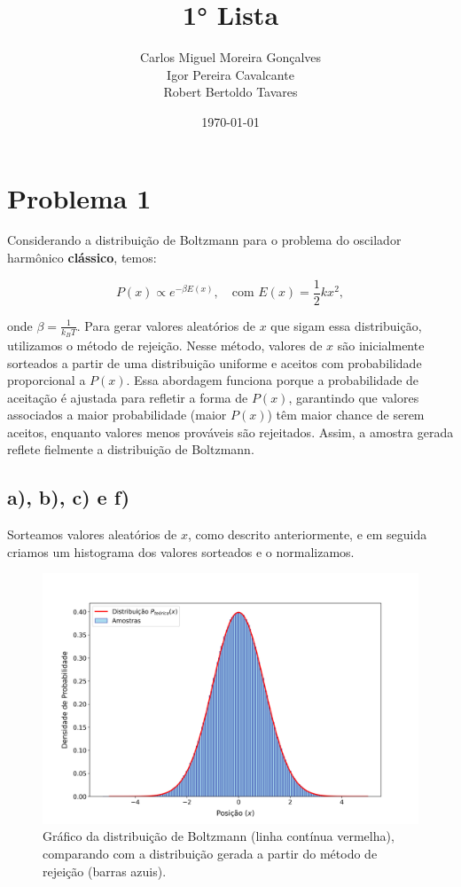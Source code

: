\documentclass[a4paper, 12pt]{article}
\title{\textbf{1° Lista}}
\author{
    Carlos Miguel Moreira Gonçalves \\
    Igor Pereira Cavalcante \\
    Robert Bertoldo Tavares \\
}
\date{\today}
\begin{document}
\maketitle
\thispagestyle{fancy}

\section*{Problema 1}
Considerando a distribuição de Boltzmann para o problema do oscilador harmônico \textbf{clássico}, temos:

\begin{equation}
P(x) \propto e^{-\beta E(x)}, \quad \text{com } E(x) = \frac{1}{2} k x^2,
\end{equation}

onde \(\beta = \frac{1}{k_B T}\). Para gerar valores aleatórios de \(x\) que sigam essa distribuição, utilizamos o método de rejeição. Nesse método, valores de \(x\) são inicialmente sorteados a partir de uma distribuição uniforme e aceitos com probabilidade proporcional a \(P(x)\). Essa abordagem funciona porque a probabilidade de aceitação é ajustada para refletir a forma de \(P(x)\), garantindo que valores associados a maior probabilidade (maior \(P(x)\)) têm maior chance de serem aceitos, enquanto valores menos prováveis são rejeitados. Assim, a amostra gerada reflete fielmente a distribuição de Boltzmann.

\subsection*{a), b), c) e f)}

Sorteamos valores aleatórios de \(x\), como descrito anteriormente, e em seguida criamos um histograma dos valores sorteados e o normalizamos.

\begin{figure}[H]
    \centering
    \includegraphics[scale=0.39]{Q1_a.png}
    \caption{Gráfico da distribuição de Boltzmann (linha contínua vermelha), comparando com a distribuição gerada a partir do método de rejeição (barras azuis).}
    \label{fig:Q1_a}
\end{figure}
\end{document}
